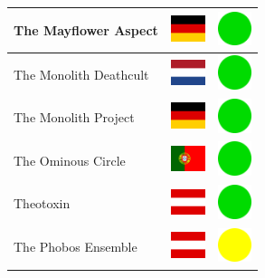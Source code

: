 \documentclass[12pt, a4paper, twoside]{report}
\begin{document}
\begin{center}
\begin{longtable}{|p{5cm}|p{2cm}|p{2cm}|}
 The Mayflower Aspect                                       & \includegraphics[width=1cm]{../4x3/de} &   \includegraphics[width=1cm]{../likes/y} \\ \hline
 The Monolith Deathcult                                     & \includegraphics[width=1cm]{../4x3/nl} &   \includegraphics[width=1cm]{../likes/y} \\ \hline
 The Monolith Project                                       & \includegraphics[width=1cm]{../4x3/de} &   \includegraphics[width=1cm]{../likes/y} \\ \hline
 The Ominous Circle                                         & \includegraphics[width=1cm]{../4x3/pt} &   \includegraphics[width=1cm]{../likes/y} \\ \hline
 Theotoxin                                                  & \includegraphics[width=1cm]{../4x3/at} &   \includegraphics[width=1cm]{../likes/y} \\ \hline
 The Phobos Ensemble                                        & \includegraphics[width=1cm]{../4x3/at} &   \includegraphics[width=1cm]{../likes/m} \\ \hline

\end{longtable}
\end{center}
\end{document}
